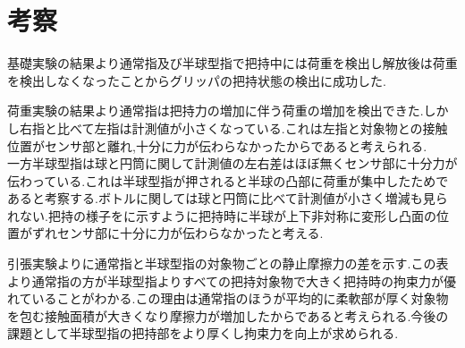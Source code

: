 \section{考察}
基礎実験の結果より通常指及び半球型指で把持中には荷重を検出し解放後は荷重を検出しなくなったことからグリッパの把持状態の検出に成功した.\par
荷重実験の結果より通常指は把持力の増加に伴う荷重の増加を検出できた.しかし右指と比べて左指は計測値が小さくなっている.これは左指と対象物との接触位置がセンサ部と離れ,十分に力が伝わらなかったからであると考えられる.\\
一方半球型指は球と円筒に関して計測値の左右差はほぼ無くセンサ部に十分力が伝わっている.これは半球型指が押されると半球の凸部に荷重が集中したためであると考察する.ボトルに関しては球と円筒に比べて計測値が小さく増減も見られない.把持の様子をに示すように把持時に半球が上下非対称に変形し凸面の位置がずれセンサ部に十分に力が伝わらなかったと考える.\par
引張実験よりに通常指と半球型指の対象物ごとの静止摩擦力の差を示す.この表より通常指の方が半球型指よりすべての把持対象物で大きく把持時の拘束力が優れていることがわかる.この理由は通常指のほうが平均的に柔軟部が厚く対象物を包む接触面積が大きくなり摩擦力が増加したからであると考えられる.今後の課題として半球型指の把持部をより厚くし拘束力を向上が求められる.

